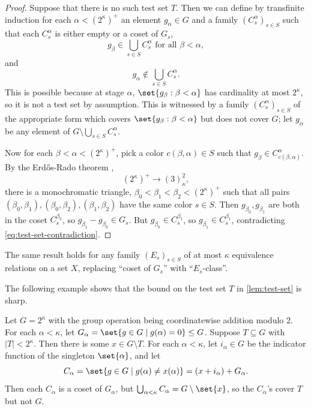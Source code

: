 \documentclass[11pt]{article}
\begin{document}
\begin{proof}
    Suppose that there is no such test set $T$. 
    Then we can define by transfinite induction for each $\alpha < (2^\kappa)^+$ an element $g_\alpha \in G$ and a family $(C_s^\alpha)_{s \in S}$ such that each $C_s^\alpha$ is either empty or a coset of $G_s$, 
    \[ g_\beta \in \bigcup_{s \in S} C_s^\alpha \text{ for all } \beta < \alpha, \] 
    and 
    \[ g_\alpha \not \in \bigcup_{s \in S} C_s^\alpha. \tag{$\ast$} \label{eq:test-set-contradiction} \]
    This is possible because at stage $\alpha$, $\set{g_\beta : \beta < \alpha}$ has cardinality at most $2^\kappa$, so it is not a test set by assumption. 
    This is witnessed by a family $(C_s^\alpha)_{s \in S}$ of the appropriate form which covers $\set{g_\beta : \beta < \alpha}$ but does not cover $G$; let $g_\alpha$ be any element of $G \setminus \bigcup_{s \in S} C_s^\alpha$.

    Now for each $\beta < \alpha < (2^\kappa)^+$, pick a color $c(\beta,\alpha) \in S$ such that $g_\beta \in C_{c(\beta,\alpha)}^\alpha$. 
    By the Erd\H{o}s-Rado theorem \cite{ER1956},
    \[ 
        (2^\kappa)^+ \to (3)^2_\kappa, 
    \]
    there is a monochromatic triangle, $\beta_0 < \beta_1 < \beta_2 < (2^\kappa)^+$ such that all pairs $(\beta_0,\beta_1), (\beta_0,\beta_2), (\beta_1,\beta_2)$ have the same color $s \in S$. 
    Then $g_{\beta_0}, g_{\beta_1}$ are both in the coset $C_s^{\beta_2}$, so $g_{\beta_1} - g_{\beta_0} \in G_s$. 
    But $g_{\beta_0} \in C_s^{\beta_1}$, so $g_{\beta_1} \in C_s^{\beta_1}$, contradicting \eqref{eq:test-set-contradiction}.
\end{proof}

\begin{remark}
    The same result holds for any family $(E_s)_{s \in S}$ of at most $\kappa$ equivalence relations on a set $X$, replacing ``coset of $G_s$'' with ``$E_s$-class''.
\end{remark}

\begin{example}
    The following example shows that the bound on the test set $T$ in \cref{lem:test-set} is sharp. 

    Let $G = 2^\kappa$ with the group operation being coordinatewise addition modulo 2. For each $\alpha < \kappa$, let $G_\alpha = \set{g \in G \mid g(\alpha) = 0} \leq G$. Suppose $T \subseteq G$ with $|T| < 2^\kappa$. Then there is some $x \in G \setminus T$. For each $\alpha < \kappa$, let $i_\alpha \in G$ be the indicator function of the singleton $\set{\alpha}$, and let
    \[
    C_\alpha = \set{g \in G \mid g(\alpha) \neq x(\alpha)} = (x + i_\alpha) + G_\alpha. 
    \]
    Then each $C_\alpha$ is a coset of $G_\alpha$, but $\bigcup_{\alpha < \kappa} C_\alpha = G \setminus \set{x}$, so the $C_\alpha$'s cover $T$ but not $G$.
\end{example}
\end{document}
